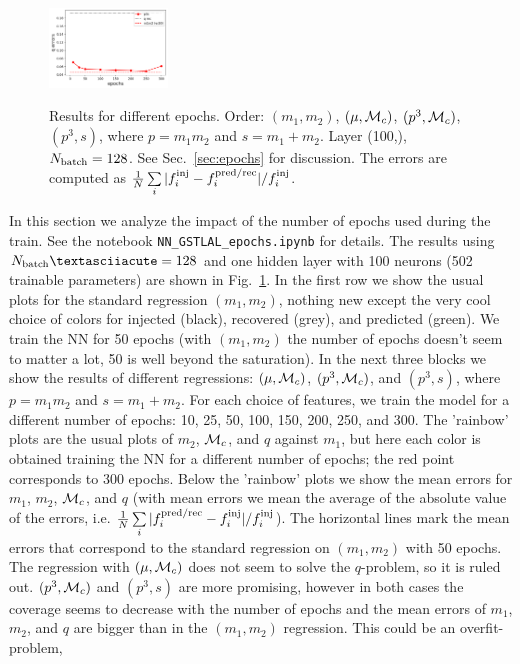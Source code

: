 \documentclass[prd,aps,twocolumn,a4paper,showkeys,nofootinbib]{revtex4-1}
\def\Mc{{\cal M}_c}
\begin{document}
\begin{figure}[]
  \includegraphics[width=0.28\textwidth]{./Figs/p3s_err_q.png} \\
  \caption{\label{fig:epochs} Results for different epochs. Order:
  $(m_1, m_2)$, $(\mu, \Mc)$, $(p^3, \Mc)$, $(p^3, s)$, where
  $p=m_1 m_2$ and $s=m_1+m_2$. Layer (100,), $N_{\rm batch}=128$. 
  See Sec.~\ref{sec:epochs} for discussion. The errors are computed as
  $\frac{1}{N} \sum\limits_i |f_i^{\rm inj} - f_i^{\rm pred/rec}|/f_i^{\rm inj}$. }
\end{figure}
%
In this section we analyze the impact of the number of epochs used during the train. See the notebook \texttt{NN{\_}GSTLAL{\_}epochs.ipynb} for details.
The results using $N_{\rm batch}´ = 128$ and one hidden
layer with 100 neurons (502 trainable parameters) are shown in Fig.~\ref{fig:epochs}.
In the first row we show the usual plots for the standard regression $(m_1, m_2)$, 
nothing new except the very cool choice of colors for injected (black), recovered (grey),
and predicted (green). We train the NN for 50 epochs (with $(m_1, m_2)$
the number of epochs doesn't seem to matter a lot, 50 is well beyond the saturation). 
In the next three blocks we show the results of different regressions:
$(\mu, \Mc)$, $(p^3, \Mc)$, and $(p^3, s)$, where $p=m_1 m_2$ and $s=m_1+m_2$.
For each choice of features, we train the model for a different
number of epochs: 10, 25, 50, 100, 150, 200, 250, and 300.
The 'rainbow' plots are the usual plots of $m_2$, $\Mc$, and $q$ against $m_1$, 
but here each color is obtained training the NN for a different number of epochs;
the red point corresponds to 300 epochs. Below the 'rainbow' plots we
show the mean errors for $m_1$, $m_2$, $\Mc$, and $q$ (with mean errors
we mean the average of the absolute value of the errors, i.e. 
$\frac{1}{N} \sum\limits_i |f_i^{\rm pred/rec} - f_i^{\rm inj}|/f_i^{\rm inj}$). 
The horizontal lines mark the mean errors that correspond to the standard regression
on $(m_1, m_2)$ with 50 epochs. The regression with 
$(\mu, \Mc)$ does not seem to solve the $q$-problem, so it is ruled out.
$(p^3, \Mc)$ and $(p^3, s)$ are more promising, however in both cases 
the coverage seems to decrease with the number of epochs and the 
mean errors of $m_1$, $m_2$, and $q$ are bigger than in the $(m_1, m_2)$ regression. 
This could be an overfit-problem,
\end{document}
